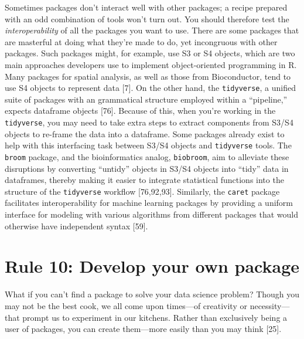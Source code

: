 \documentclass[10pt,letterpaper]{article}
\begin{document}
Sometimes packages don't interact well with other packages; a recipe
prepared with an odd combination of tools won't turn out. You should
therefore test the \emph{interoperability} of all the packages you want
to use. There are some packages that are masterful at doing what they're
made to do, yet incongruous with other packages. Such packages might,
for example, use S3 or S4 objects, which are two main approaches
developers use to implement object-oriented programming in R. Many
packages for spatial analysis, as well as those from Bioconductor, tend
to use S4 objects to represent data {[}7{]}. On the other hand, the
\texttt{tidyverse}, a unified suite of packages with an grammatical
structure employed within a ``pipeline,'' expects dataframe objects
{[}76{]}. Because of this, when you're working in the
\texttt{tidyverse}, you may need to take extra steps to extract
components from S3/S4 objects to re-frame the data into a dataframe.
Some packages already exist to help with this interfacing task between
S3/S4 objects and \texttt{tidyverse} tools. The \texttt{broom} package,
and the bioinformatics analog, \texttt{biobroom}, aim to alleviate these
disruptions by converting ``untidy'' objects in S3/S4 objects into
``tidy'' data in dataframes, thereby making it easier to integrate
statistical functions into the structure of the \texttt{tidyverse}
workflow {[}76,92,93{]}. Similarly, the \texttt{caret} package
facilitates interoperability for machine learning packages by providing
a uniform interface for modeling with various algorithms from different
packages that would otherwise have independent syntax {[}59{]}.

\hypertarget{rule-10-develop-your-own-package}{%
\section{Rule 10: Develop your own
package}\label{rule-10-develop-your-own-package}}

What if you can't find a package to solve your data science problem?
Though you may not be the best cook, we all come upon times---of
creativity or necessity---that prompt us to experiment in our kitchens.
Rather than exclusively being a user of packages, you can create
them---more easily than you may think {[}25{]}.
\end{document}
